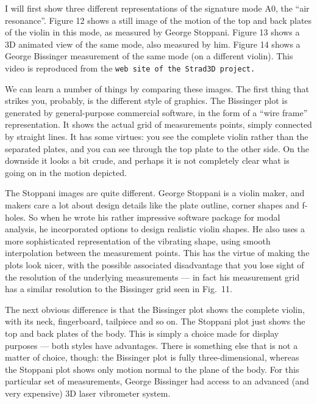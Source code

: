   I will first show three different representations of the signature mode A0, 
  the “air resonance”. Figure 12 shows a still image of the motion of the top 
  and back plates of the violin in this mode, as measured by George Stoppani. 
  Figure 13 shows a 3D animated view of the same mode, also measured by him. 
  Figure 14 shows a George Bissinger measurement of the same mode (on a 
  different violin). This video is reproduced from the \tt{}web site of the 
  Strad3D project\rm{}. 

  We can learn a number of things by comparing these images. The first thing 
  that strikes you, probably, is the different style of graphics. The Bissinger 
  plot is generated by general-purpose commercial software, in the form of a 
  “wire frame” representation. It shows the actual grid of measurements points, 
  simply connected by straight lines. It has some virtues: you see the complete 
  violin rather than the separated plates, and you can see through the top 
  plate to the other side. On the downside it looks a bit crude, and perhaps it 
  is not completely clear what is going on in the motion depicted. 

  The Stoppani images are quite different. George Stoppani is a violin maker, 
  and makers care a lot about design details like the plate outline, corner 
  shapes and f-holes. So when he wrote his rather impressive software package 
  for modal analysis, he incorporated options to design realistic violin 
  shapes. He also uses a more sophisticated representation of the vibrating 
  shape, using smooth interpolation between the measurement points. This has 
  the virtue of making the plots look nicer, with the possible associated 
  disadvantage that you lose sight of the resolution of the underlying 
  measurements — in fact his measurement grid has a similar resolution to the 
  Bissinger grid seen in Fig.\ 11. 

  The next obvious difference is that the Bissinger plot shows the complete 
  violin, with its neck, fingerboard, tailpiece and so on. The Stoppani plot 
  just shows the top and back plates of the body. This is simply a choice made 
  for display purposes — both styles have advantages. There is something else 
  that is not a matter of choice, though: the Bissinger plot is fully 
  three-dimensional, whereas the Stoppani plot shows only motion normal to the 
  plane of the body. For this particular set of measurements, George Bissinger 
  had access to an advanced (and very expensive) 3D laser vibrometer system. 

